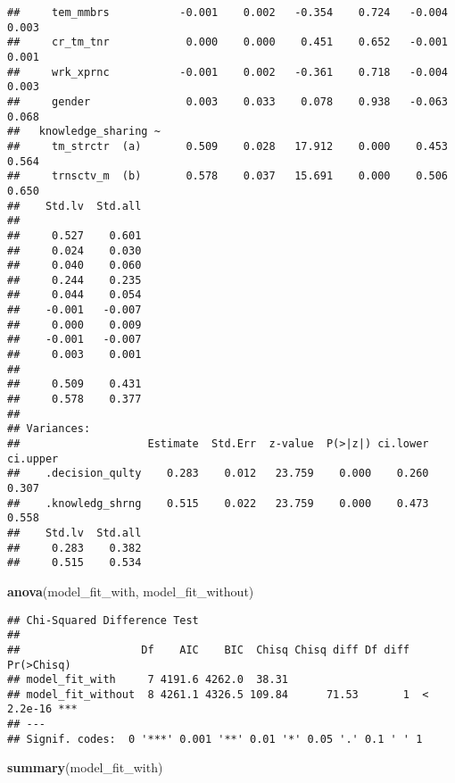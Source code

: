 \documentclass[]{article}
\newenvironment{Shaded}{\begin{snugshade}}{\end{snugshade}}
\newcommand{\KeywordTok}[1]{\textcolor[rgb]{0.13,0.29,0.53}{\textbf{#1}}}
\newcommand{\NormalTok}[1]{#1}
\begin{document}
\begin{verbatim}
##     tem_mmbrs           -0.001    0.002   -0.354    0.724   -0.004    0.003
##     cr_tm_tnr            0.000    0.000    0.451    0.652   -0.001    0.001
##     wrk_xprnc           -0.001    0.002   -0.361    0.718   -0.004    0.003
##     gender               0.003    0.033    0.078    0.938   -0.063    0.068
##   knowledge_sharing ~                                                      
##     tm_strctr  (a)       0.509    0.028   17.912    0.000    0.453    0.564
##     trnsctv_m  (b)       0.578    0.037   15.691    0.000    0.506    0.650
##    Std.lv  Std.all
##                   
##     0.527    0.601
##     0.024    0.030
##     0.040    0.060
##     0.244    0.235
##     0.044    0.054
##    -0.001   -0.007
##     0.000    0.009
##    -0.001   -0.007
##     0.003    0.001
##                   
##     0.509    0.431
##     0.578    0.377
## 
## Variances:
##                    Estimate  Std.Err  z-value  P(>|z|) ci.lower ci.upper
##    .decision_qulty    0.283    0.012   23.759    0.000    0.260    0.307
##    .knowledg_shrng    0.515    0.022   23.759    0.000    0.473    0.558
##    Std.lv  Std.all
##     0.283    0.382
##     0.515    0.534
\end{verbatim}

\begin{Shaded}
\begin{Highlighting}[]
\KeywordTok{anova}\NormalTok{(model_fit_with, model_fit_without)}
\end{Highlighting}
\end{Shaded}

\begin{verbatim}
## Chi-Squared Difference Test
## 
##                   Df    AIC    BIC  Chisq Chisq diff Df diff Pr(>Chisq)    
## model_fit_with     7 4191.6 4262.0  38.31                                  
## model_fit_without  8 4261.1 4326.5 109.84      71.53       1  < 2.2e-16 ***
## ---
## Signif. codes:  0 '***' 0.001 '**' 0.01 '*' 0.05 '.' 0.1 ' ' 1
\end{verbatim}

\begin{Shaded}
\begin{Highlighting}[]
\KeywordTok{summary}\NormalTok{(model_fit_with)}
\end{Highlighting}
\end{Shaded}
\end{document}
